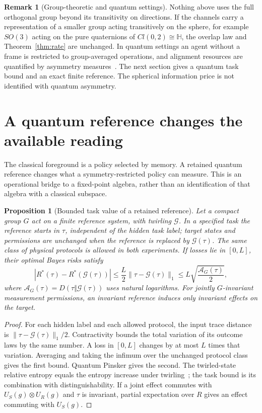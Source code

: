 \documentclass[12pt]{article}
\newtheorem{proposition}[theorem]{Proposition}
\theoremstyle{definition}
\newtheorem{remark}[theorem]{Remark}
\begin{document}
\begin{remark}[Group-theoretic and quantum settings]
\label{rem:clifford}
Nothing above uses the full orthogonal group beyond its transitivity on directions. If the channels carry a representation of a smaller group acting transitively on the sphere, for example $SO(3)$ acting on the pure quaternions of $Cl(0,2)\cong\mathbb H$, the overlap law and Theorem~\ref{thm:rate} are unchanged. In quantum settings an agent without a frame is restricted to group-averaged operations, and alignment resources are quantified by asymmetry measures~\cite{BRS2007,SkotiniotisGour2012}. The next section gives a quantum task bound and an exact finite reference. The spherical information price is not identified with quantum asymmetry.
\end{remark}

\section{A quantum reference changes the available reading}
\label{sec:quantum-frame}

The classical foreground is a policy selected by memory. A retained quantum
reference changes what a symmetry-restricted policy can measure. This is an
operational bridge to a fixed-point algebra, rather than an identification
of that algebra with a classical subspace.

\begin{proposition}[Bounded task value of a retained reference]
\label{prop:reference-value}
Let a compact group $G$ act on a finite reference system, with twirling
$\mathcal G$. In a specified task the reference starts in $\tau$, independent
of the hidden task label; target states and permissions are unchanged when
the reference is replaced by $\mathcal G(\tau)$. The same class of physical
protocols is allowed in both experiments. If losses lie in $[0,L]$, their
optimal Bayes risks satisfy
\begin{equation}\label{eq:asymmetry-risk}
 |R^*(\tau)-R^*(\mathcal G(\tau))|
 \le\frac L2\|\tau-\mathcal G(\tau)\|_1
 \le L\sqrt{\frac{\mathcal A_G(\tau)}2},
\end{equation}
where $\mathcal A_G(\tau)=D(\tau\Vert\mathcal G(\tau))$
uses natural logarithms. For jointly $G$-invariant measurement permissions,
an invariant reference induces only invariant effects on the target.
\end{proposition}
\begin{proof}
For each hidden label and each allowed protocol, the input trace distance
is $\|\tau-\mathcal G(\tau)\|_1/2$. Contractivity bounds the total variation
of its outcome laws by the same number. A loss in $[0,L]$ changes by at
most $L$ times that variation. Averaging and taking the infimum over the
unchanged protocol class gives the first bound. Quantum Pinsker gives
the second. The twirled-state relative entropy equals the entropy increase
under twirling~\cite[Proposition~2 and Theorem~3]{Gour2009}; the task bound
is its combination with distinguishability. If a joint effect commutes
with $U_S(g)\otimes U_R(g)$ and $\tau$ is invariant, partial expectation
over $R$ gives an effect commuting with $U_S(g)$.
\end{proof}
\end{document}
